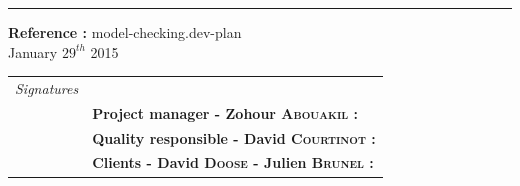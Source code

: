 \documentclass{report}
\begin{document}
\begin{titlepage}


\vspace*{4.5cm}

\noindent
\begin{minipage}{0.35\linewidth}
    \begin{flushright}
        \printauthor
    \end{flushright}
\end{minipage} \hspace{15pt}
%
\begin{minipage}{0.02\linewidth}
    \rule{1pt}{175pt}
\end{minipage} \hspace{-10pt}
%
\begin{minipage}{0.6\linewidth}
\vspace{5pt}
\newenvironment{test}{\begin{center}}{\end{center}}
\hspace{10pt}
\begin{minipage}{\linewidth} 
\textbf{Reference :} model-checking.dev-plan ~\\
January $29^{th}$ 2015
\end{minipage}
\end{minipage}

\vspace{8cm}
\begin{minipage}{0.20\linewidth}
    \begin{flushright}
       
        \begin{tabular}{ll}
	 \textit{Signatures} & \\
            & \textbf{Project manager - Zohour \textsc{Abouakil} :} \\
            & \textbf{Quality responsible - David \textsc{Courtinot} :} \\
            & \textbf{Clients - David \textsc{Doose} - Julien \textsc{Brunel} :} \\
        \end{tabular}
    \end{flushright}
\end{minipage}

\end{titlepage}
\restoregeometry
\tableofcontents
{}
\end{document}
